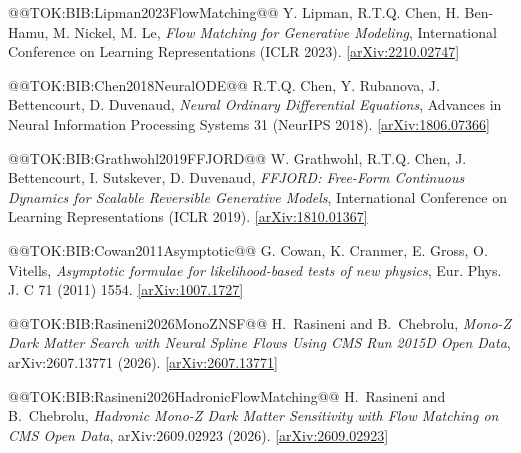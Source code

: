 \documentclass{article}
\begin{document}
@@TOK:BIB:Lipman2023FlowMatching@@ Y. Lipman, R.T.Q. Chen, H. Ben-Hamu, M. Nickel, M. Le,
\emph{Flow Matching for Generative Modeling},
International Conference on Learning Representations (ICLR 2023). \href{https://arxiv.org/abs/2210.02747}{[arXiv:2210.02747]}

@@TOK:BIB:Chen2018NeuralODE@@ R.T.Q. Chen, Y. Rubanova, J. Bettencourt, D. Duvenaud,
\emph{Neural Ordinary Differential Equations},
Advances in Neural Information Processing Systems 31 (NeurIPS 2018). \href{https://arxiv.org/abs/1806.07366}{[arXiv:1806.07366]}

@@TOK:BIB:Grathwohl2019FFJORD@@ W. Grathwohl, R.T.Q. Chen, J. Bettencourt, I. Sutskever, D. Duvenaud,
\emph{FFJORD: Free-Form Continuous Dynamics for Scalable Reversible Generative Models},
International Conference on Learning Representations (ICLR 2019). \href{https://arxiv.org/abs/1810.01367}{[arXiv:1810.01367]}

@@TOK:BIB:Cowan2011Asymptotic@@ G. Cowan, K. Cranmer, E. Gross, O. Vitells,
\emph{Asymptotic formulae for likelihood-based tests of new physics},
Eur. Phys. J. C 71 (2011) 1554. \href{https://arxiv.org/abs/1007.1727}{[arXiv:1007.1727]}

@@TOK:BIB:Rasineni2026MonoZNSF@@ H.~Rasineni and B.~Chebrolu,
\emph{Mono-Z Dark Matter Search with Neural Spline Flows Using CMS Run 2015D Open Data},
arXiv:2607.13771 (2026). \href{https://arxiv.org/abs/2607.13771}{[arXiv:2607.13771]}

@@TOK:BIB:Rasineni2026HadronicFlowMatching@@ H.~Rasineni and B.~Chebrolu,
\emph{Hadronic Mono-Z Dark Matter Sensitivity with Flow Matching on CMS Open Data},
arXiv:2609.02923 (2026). \href{https://arxiv.org/abs/2609.02923}{[arXiv:2609.02923]}
\end{document}
